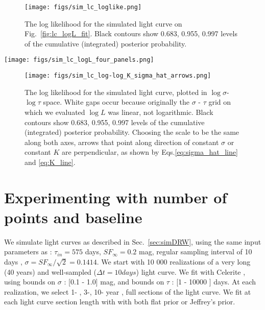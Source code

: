 \documentclass[fleqn,usenatbib]{mnras}  %
\begin{document}
\begin{figure}
\texttt{[image: figs/sim\_lc\_loglike.png]}
\caption{The log likelihood for the simulated light curve on Fig.~\ref{fig:lc_logL_fit}. Black contours show 0.683, 0.955, 0.997 levels of the cumulative (integrated) posterior probability. }
\label{fig:lc_logL}
\end{figure} 





\begin{figure*}
\texttt{[image: figs/sim\_lc\_logL\_four\_panels.png]}
\caption{For each pixel on the  $\sigma$ - $\tau$ grid we evaluated the log-likelihood value, $\log{L}$, shown on the bottom-right panel (same as Fig.~\ref{fig:lc_logL}). In addition, given these  $\sigma$ and $\tau$ we also evaluated $K$ and $\hat{\sigma}$, which enabled, given $\{ \sigma, \tau, \hat{\sigma}, K, \log{L} \}$, plotting $\log{L}$ in space of $K$-$\hat{\sigma}$, or any other parameter as a function of the other two. }
\label{fig:lc_logL_panels}
\end{figure*} 

\begin{figure}
\texttt{[image: figs/sim\_lc\_log-log\_K\_sigma\_hat\_arrows.png]}
\caption{The log likelihood for the simulated light curve, plotted in  $\log{\sigma}$-$\log{\tau}$ space.  White gaps occur because originally the   $\sigma$ - $\tau$ grid on which we evaluated $\log{L}$ was linear, not logarithmic.  Black contours show 0.683, 0.955, 0.997 levels of the cumulative (integrated) posterior probability. Choosing the scale to be the same along both axes,  arrows that point along direction of constant $\hat{\sigma}$ or constant $K$ are perpendicular, as shown by Eqs.\ref{eq:sigma_hat_line} and \ref{eq:K_line}. }
\label{fig:lc_logL_arrows}
\end{figure} 


\section{Experimenting with number of points and baseline}

We simulate  light curves as described in Sec.~\ref{sec:simDRW}, using the same input parameters as \cite{macleod2011} : $\tau_{in} = 575 $ days, $SF_{\infty}= 0.2 $ mag, regular sampling interval of 10 days ,  $\sigma = SF_{\infty} / \sqrt{2} = 0.1414 $.  We start with 10 000 realizations of a very long (40 years)  and well-sampled  ($\Delta t = 10 days$) light curve.  We fit with Celerite , using bounds on $\sigma$ : [0.1 - 1.0] mag,  and bounds on $\tau$ : [1 - 10000 ] days. At each realization,  we select 1- , 3-, 10- year , full sections of the light curve. We fit at each light curve section length with   with both flat prior or Jeffrey's prior. 
\end{document}
